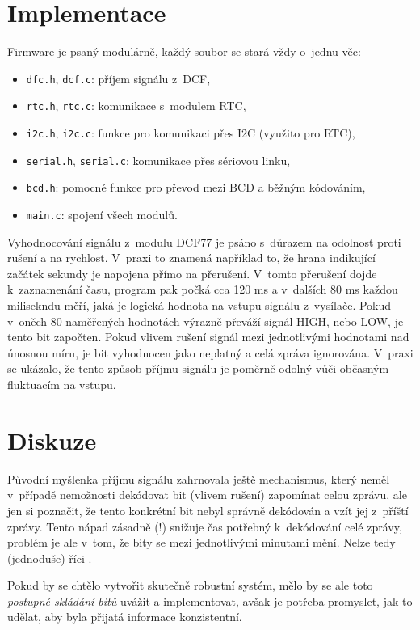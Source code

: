 \documentclass[12pt,a4paper]{article}
\begin{document}
\section{Implementace}

Firmware je psaný modulárně, každý soubor se stará vždy o~jednu věc:
\begin{itemize}
	\setlength{\itemsep}{1pt}
	\setlength{\parskip}{0pt}
	\setlength{\parsep}{0pt}

	\item \texttt{dfc.h}, \texttt{dcf.c}: příjem signálu z~DCF,
	\item \texttt{rtc.h}, \texttt{rtc.c}: komunikace s~modulem RTC,
	\item \texttt{i2c.h}, \texttt{i2c.c}: funkce pro komunikaci přes I2C
		(využito pro RTC),
	\item \texttt{serial.h}, \texttt{serial.c}: komunikace přes sériovou linku,
	\item \texttt{bcd.h}: pomocné funkce pro převod mezi BCD a běžným kódováním,
	\item \texttt{main.c}: spojení všech modulů.
\end{itemize}

Vyhodnocování signálu z~modulu DCF77 je psáno s~důrazem na odolnost proti rušení
a na rychlost. V~praxi to znamená například to, že hrana indikující začátek sekundy
je napojena přímo na přerušení. V~tomto přerušení dojde k zaznamenání času,
program pak počká cca 120 ms a v~dalších 80 ms každou milisekndu měří, jaká
je logická hodnota na vstupu signálu z~vysílače. Pokud v~oněch 80 naměřených
hodnotách výrazně převáží signál HIGH, nebo LOW, je tento bit započten. Pokud
vlivem rušení signál  mezi jednotlivými hodnotami nad únosnou
míru, je bit vyhodnocen jako neplatný a celá zpráva ignorována. V~praxi se
ukázalo, že tento způsob příjmu signálu je poměrně odolný vůči občasným
fluktuacím na vstupu.

\section{Diskuze}

Původní myšlenka příjmu signálu zahrnovala ještě mechanismus, který neměl
v~případě nemožnosti dekódovat bit (vlivem rušení) zapomínat celou zprávu,
ale jen si poznačit, že tento konkrétní bit nebyl správně dekódován a vzít
jej z~příští zprávy. Tento nápad zásadně (!) snižuje čas potřebný
k~dekódování celé zprávy, problém je ale v~tom, že bity se mezi jednotlivými
minutami mění. Nelze tedy (jednoduše) říci .

Pokud by se chtělo vytvořit skutečně robustní systém, mělo by se ale toto
\textit{postupné skládání bitů} uvážit a implementovat, avšak je potřeba
promyslet, jak to udělat, aby byla přijatá informace konzistentní.
\end{document}
